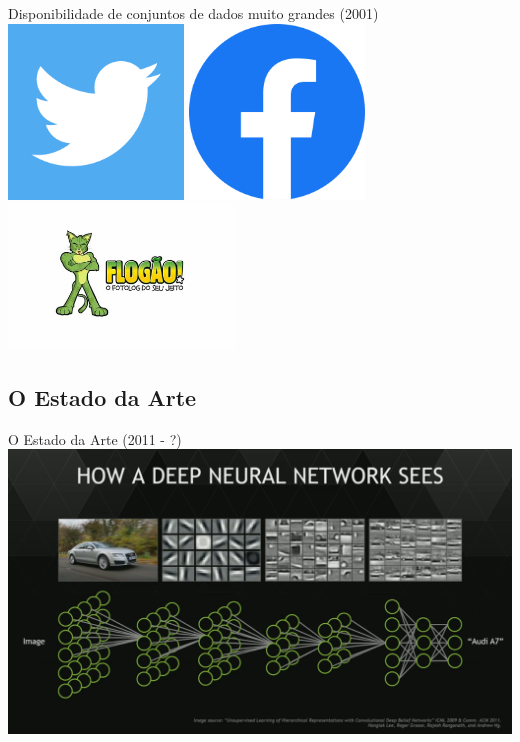 \documentclass{libs/ufc_format}
\begin{document}
\begin{frame}{Disponibilidade de conjuntos de dados muito grandes (2001)}
    \centering
    \includegraphics[width=0.35\textwidth]{figuras/twitter_logo}
    \includegraphics[width=0.35\textwidth]{figuras/facebook_logo}\\
    \includegraphics[width=0.45\textwidth]{figuras/flogao_logo}
\end{frame}

\subsection{O Estado da Arte}

\begin{frame}{O Estado da Arte (2011 - ?)}
    \centering
    \includegraphics[width=\textwidth]{figuras/deeplearning}
\end{frame}
\end{document}
